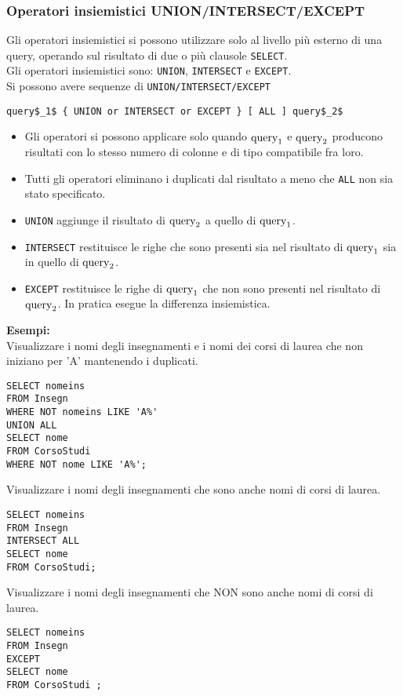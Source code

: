\documentclass[a4paper, 10pt, titlepage]{article}
\begin{document}
	\subsubsection*{Operatori insiemistici UNION/INTERSECT/EXCEPT}
		Gli operatori insiemistici si possono utilizzare solo al livello più esterno
		di una query, operando sul risultato di due o più clausole \lstinline|SELECT|.\\
		Gli operatori insiemistici sono: \lstinline|UNION|, \lstinline|INTERSECT| e \lstinline|EXCEPT|.\\
		Si possono avere sequenze di \lstinline|UNION/INTERSECT/EXCEPT|
		\begin{lstlisting}[mathescape]
query$_1$ { UNION or INTERSECT or EXCEPT } [ ALL ] query$_2$
		\end{lstlisting}
		\begin{itemize}
				\item Gli operatori si possono applicare solo quando $ \textup{query}_1 $ e 
				$ \textup{query}_2 $ producono risultati con lo stesso numero di colonne e di tipo compatibile
				fra loro.
				\item Tutti gli operatori eliminano i duplicati dal risultato a meno che \lstinline|ALL| non
				sia stato specificato.
				\item \lstinline|UNION| aggiunge il risultato di $ \textup{query}_2 $ a quello di 
				$ \textup{query}_1 $.
				\item \lstinline|INTERSECT| restituisce le righe che sono presenti sia nel risultato di
				$ \textup{query}_1 $ sia in quello di $ \textup{query}_2 $.
				\item \lstinline|EXCEPT| restituisce le righe di $ \textup{query}_1 $ che non sono presenti nel risultato
				di $ \textup{query}_2 $. In pratica esegue la differenza insiemistica.
			\end{itemize}
		\textbf{Esempi: }\\
		Visualizzare i nomi degli insegnamenti e i nomi dei corsi di laurea che non
		iniziano per ’A’ mantenendo i duplicati.
		\begin{lstlisting}
SELECT nomeins
FROM Insegn
WHERE NOT nomeins LIKE 'A%'
UNION ALL
SELECT nome
FROM CorsoStudi
WHERE NOT nome LIKE 'A%';
		\end{lstlisting} \medskip
		Visualizzare i nomi degli insegnamenti che sono anche nomi di corsi di
		laurea.
		\begin{lstlisting}
SELECT nomeins
FROM Insegn
INTERSECT ALL
SELECT nome
FROM CorsoStudi;
		\end{lstlisting} \medskip
		Visualizzare i nomi degli insegnamenti che NON sono anche nomi di corsi di
		laurea.
		\begin{lstlisting}
SELECT nomeins
FROM Insegn
EXCEPT
SELECT nome
FROM CorsoStudi ;
		\end{lstlisting}
	\newpage
\end{document}
